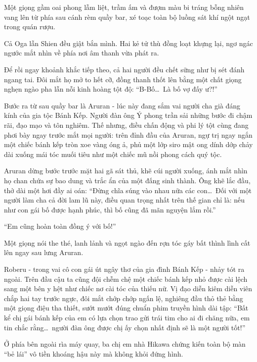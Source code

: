\documentclass[../main.tex]{subfiles}
\begin{document}
Một giọng gầm oai phong lẫm liệt, trầm ấm và đượm màu bi tráng bỗng nhiên vang lên từ phía sau cánh rèm quầy bar, xé toạc toàn bộ luồng sát khí ngột ngạt trong quán rượu.

Cả Oga lẫn Shien đều giật bắn mình. Hai kẻ tử thù đồng loạt khựng lại, ngơ ngác ngước mắt nhìn về phía nơi âm thanh vừa phát ra.

Để rồi ngay khoảnh khắc tiếp theo, cả hai người đều chết sững như bị sét đánh ngang tai. Đôi mắt họ mở to hết cỡ, đồng thanh thốt lên bằng một chất giọng nghẹn ngào pha lẫn nỗi kinh hoàng tột độ: ``B-Bố\dots\ Là bố vợ đấy ư?!''

Bước ra từ sau quầy bar là Aruran - lúc này đang sắm vai người cha già đáng kính của gia tộc Bánh Kếp. Người đàn ông Ý phong trần sải những bước đi chậm rãi, đạo mạo và tôn nghiêm. Thế nhưng, điều chấn động và phi lý tột cùng đang phơi bày ngay trước mắt mọi người: trên đỉnh đầu của Aruran, ngự trị ngay ngắn một chiếc bánh kếp tròn xoe vàng óng ả, phủ một lớp siro mật ong dính dớp chảy dài xuống mái tóc muối tiêu như một chiếc mũ nồi phong cách quý tộc.


Aruran dừng bước trước mặt hai gã sát thủ, khẽ cúi người xuống, ánh mắt nhìn họ chan chứa sự bao dung và trắc ẩn của một đấng sinh thành. Ông khẽ lắc đầu, thở dài một hơi đầy ai oán: ``Đừng chĩa súng vào nhau nữa các con\dots\ Đối với một người làm cha cả đời lam lũ này, điều quan trọng nhất trên thế gian chỉ là: nếu như con gái bố được hạnh phúc, thì bố cũng đã mãn nguyện lắm rồi.''

``Em cũng hoàn toàn đồng ý với bố!''

Một giọng nói the thé, lanh lảnh và ngọt ngào đến rợn tóc gáy bất thình lình cất lên ngay sau lưng Aruran.

Roberu - trong vai cô con gái út ngây thơ của gia đình Bánh Kếp - nhảy tót ra ngoài. Trên đầu cậu ta cũng đội chễm chệ một chiếc bánh kếp nhỏ được cài lệch sang một bên y hệt như chiếc nơ cài tóc của thiếu nữ. Vị đạo diễn kiêm diễn viên chắp hai tay trước ngực, đôi mắt chớp chớp ngấn lệ, nghiêng đầu thỏ thẻ bằng một giọng điệu tha thiết, sướt mướt đúng chuẩn phim truyền hình dài tập: ``Bất kể chị gái bánh kếp của em có lựa chọn trao gửi trái tim cho ai đi chăng nữa, em tin chắc rằng\dots\ người đàn ông được chị ấy chọn nhất định sẽ là một người tốt!''


Ở phía bên ngoài rìa máy quay, ba chị em nhà Hikawa chứng kiến toàn bộ màn ``bẻ lái'' vô tiền khoáng hậu này mà không khỏi đứng hình.
\end{document}
